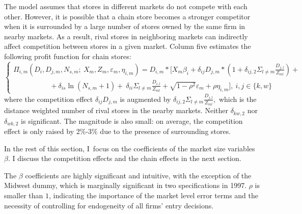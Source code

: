\documentclass[notitlepage,onecolumn,11pt]{article}
\begin{document}
The model assumes that stores in different markets do not compete with each
other. However, it is possible that a chain store becomes a stronger
competitor when it is surrounded by a large number of stores owned by the
same firm in nearby markets. As a result, rival stores in neighboring
markets can indirectly affect competition between stores in a given market.
Column five estimates the following profit function for chain stores:%
\begin{equation*}
\left\{ 
\begin{array}{c}
\Pi _{i,m}(D_{i},D_{j,m},N_{s,m};~X_{m},Z_{m},\varepsilon _{m},\eta
_{i,m})=D_{i,m}\ast \lbrack X_{m}\beta _{i}+\delta _{ij}D_{j,m}\ast
(1+\delta _{ij,2}\Sigma _{l\neq m}\frac{D_{j,l}}{Z_{ml}})+ \\ 
\ \ \ \ \ \ \ \ \ \ \ \ \ \ \ \ \ \ \ \ \ \ \ +\delta _{is}\ln (N_{s,m}+1)+\
\delta _{ii}\Sigma _{l\neq m}\frac{D_{i,l}}{Z_{ml}}+\sqrt{1-\rho ^{2}}%
\varepsilon _{m}+\rho \eta _{i,m}],~i,j\in \{k,w\}%
\end{array}%
\right.
\end{equation*}%
where the competition effect $\delta _{ij}D_{j,m}$ is augmented by $\delta
_{ij,2}\Sigma _{l\neq m}\frac{D_{j,l}}{Z_{ml}},$ which is the distance
weighted number of rival stores in the nearby markets. Neither $\delta
_{kw,2}$ nor $\delta _{wk,2}$ is significant. The magnitude is also small:
on average, the competition effect is only raised by 2\%-3\% due to the
presence of surrounding stores.

In the rest of this section, I\ focus on the coefficients of the market size
variables $\beta $. I discuss the competition effects and the chain effects
in the next section.

The $\beta $ coefficients are highly significant and intuitive, with the
exception of the Midwest dummy, which is marginally significant in two
specifications in 1997. $\rho $ is smaller than $1$, indicating the
importance of the market level error terms and the necessity of controlling
for endogeneity of all firms' entry decisions.
\end{document}
